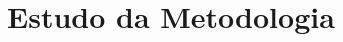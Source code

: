 \documentclass[a4paper,10pt,oneside,brazilian,
draft=false]{report}%
\begin{document}
\chapter{Estudo da Metodologia}\label{cap::method}
 







\end{document}
